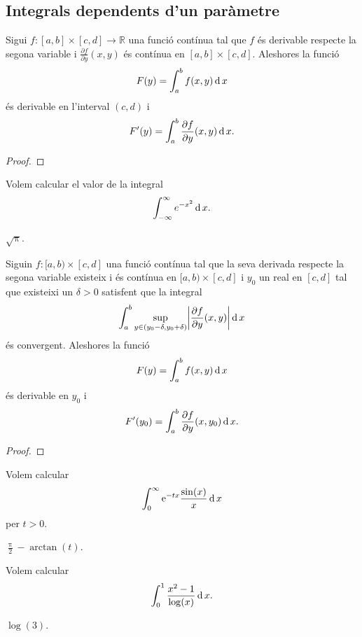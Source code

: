 \documentclass[../../Main.tex]{subfiles}
\begin{document}
	\subsection{Integrals dependents d'un paràmetre}
	\begin{theorem}
		\label{thm:criteri per la derivació sota el signe de la integral}
		Sigui \(f\colon[a,b]\times[c,d]\longrightarrow\mathbb{R}\) una funció contínua tal que \(f\) és derivable respecte la segona variable i \(\frac{\partial f}{\partial y}(x,y)\) és contínua en \([a,b]\times[c,d]\). Aleshores la funció
		\[F(y)=\int_{a}^{b}f(x,y)\operatorname{d} x\]
		és derivable en l'interval \((c,d)\) i
		\[F'(y)=\int_{a}^{b}\frac{\partial f}{\partial y}(x,y)\operatorname{d} x.\]
		\begin{proof}
		\end{proof}
	\end{theorem}
	\begin{example}
		\label{ex:integral de Gauss}
		Volem calcular el valor de la integral
		\[\int_{-\infty}^{\infty}e^{-x^{2}}\operatorname{d} x.\] %
		\begin{solution}
			\(\sqrt{\uppi}\).
		\end{solution}
	\end{example}
	\begin{theorem}
		\label{thm:criteri per la derivabilitat sota el signe de la integral}
		Siguin \(f\colon[a,b)\times[c,d]\) una funció contínua tal que la seva derivada respecte la segona variable existeix i és contínua en \([a,b)\times[c,d]\) i \(y_{0}\) un real en \([c,d]\) tal que existeixi un \(\delta>0\) satisfent que la integral
		\[\int_{a}^{b}\sup_{y\in(y_{0}-\delta,y_{0}+\delta)}\abs{\frac{\partial f}{\partial y}(x,y)}\diff x\]
		és convergent. Aleshores la funció
		\[F(y)=\int_{a}^{b}f(x,y)\operatorname{d} x\]
		és derivable en \(y_{0}\) i
		\[F'(y_{0})=\int_{a}^{b}\frac{\partial f}{\partial y}(x,y_{0})\operatorname{d} x.\]
		\begin{proof}
		\end{proof}
	\end{theorem}
	\begin{example}
		\label{ex:trobar una funció derivant sota el signe de la integral}
		Volem calcular
		\[\int_{0}^{\infty}\mathrm{e}^{-tx}\frac{\sin(x)}{x}\operatorname{d} x\]
		per \(t>0\).
		\begin{solution}
			\(\frac{\uppi}{2}-\arctan(t)\). %
		\end{solution}
	\end{example}
	\begin{example}
		\label{ex:trobar un valor derivant sota el signe de la integral inventant-se una funció}
		Volem calcular
		\[\int_{0}^{1}\frac{x^{2}-1}{\log(x)}\operatorname{d} x.\]
		\begin{solution}
			\(\log(3)\). %
		\end{solution}
	\end{example}
\end{document}
